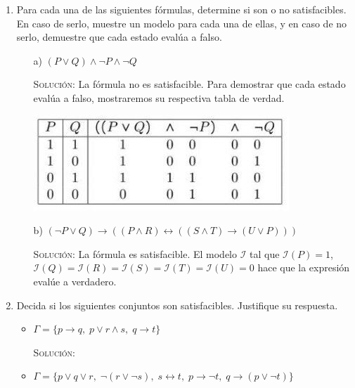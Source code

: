 \documentclass[letterpaper,11pt]{article}
\begin{document}
\begin{enumerate}
    \item Para cada una de las siguientes fórmulas, determine si son o no 
    satisfacibles. En caso de serlo, muestre un modelo para cada una de ellas,
    y en caso de no serlo, demuestre que cada estado evalúa a falso.

    \begin{itemize}
        \item[a)] $(P \lor Q) \land \neg P \land \neg Q$ 

        \textsc{Solución:} La fórmula no es satisfacible. Para demostrar que 
        cada estado evalúa a falso, mostraremos su respectiva tabla de verdad.

        \begin{center}
            \centerline{\includegraphics[scale=0.7]{tabla.jpg}}
        \end{center}

        \item[b)] $(\neg P \lor Q) → ((P \land R) ↔ ((S \land T) → (U \lor P)))$

        \textsc{Solución:} La fórmula es satisfacible. El modelo $\mathcal{I}$
        tal que $\mathcal{I}(P) = 1$, $\mathcal{I}(Q) = \mathcal{I}(R) = 
        \mathcal{I}(S) = \mathcal{I}(T) = \mathcal{I}(U) = 0$ hace 
        que la expresión evalúe a verdadero.
    \end{itemize}

    \item Decida si los siguientes conjuntos son satisfacibles. Justifique 
    su respuesta.

    \begin{itemize}
        \item $\Gamma = \{p → q, \; p \lor r \land s, \; q → t\}$

        \textsc{Solución:} 
        \item $\Gamma = \{p \lor q \lor r, \; \neg (r \lor \neg s), \; s ↔ t, \;
                          p → \neg t, \; q → (p \lor \neg t)\}$        
    \end{itemize}


\end{enumerate}
\end{document}
